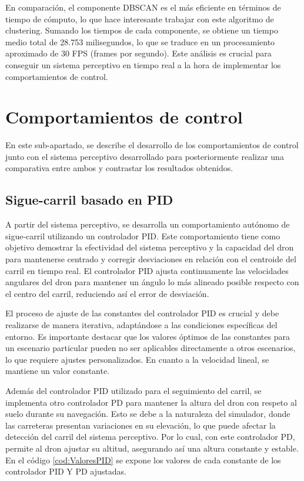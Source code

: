 En comparación, el componente DBSCAN es el más eficiente en términos de tiempo de cómputo, lo que hace interesante trabajar con este algoritmo de clustering. 
Sumando los tiempos de cada componente, se obtiene un tiempo medio total de 28.753 milisegundos, lo que se traduce en un procesamiento aproximado de 30 FPS (frames por segundo). 
Este análisis es crucial para conseguir un sistema perceptivo en tiempo real a la hora de implementar los comportamientos de control. 

  \section{Comportamientos de control}
  \label{sec:Control}

  En este sub-apartado, se describe el desarrollo de los comportamientos de control junto con el sistema perceptivo desarrollado para posteriormente realizar 
  una comparativa entre ambos y contrastar los resultados obtenidos.

\subsection{Sigue-carril basado en PID}
\label{sec:Control-PID}

A partir del sistema perceptivo, se desarrolla un comportamiento autónomo de sigue-carril utilizando un controlador PID. Este comportamiento tiene como objetivo
demostrar la efectividad del sistema perceptivo y la capacidad del dron para mantenerse centrado y corregir desviaciones en relación
con el centroide del carril en tiempo real. El controlador PID ajusta continuamente las velocidades angulares del dron para mantener un ángulo lo más alineado posible respecto con el
centro del carril, reduciendo así el error de desviación.

El proceso de ajuste de las constantes del controlador PID es crucial y debe realizarse de manera iterativa, adaptándose a las condiciones específicas del entorno. Es importante
destacar que los valores óptimos de las constantes para un escenario particular pueden no ser aplicables directamente a otros escenarios, lo que requiere ajustes personalizados. 
En cuanto a la velocidad lineal, se mantiene un valor constante.

Además del controlador PID utilizado para el seguimiento del carril, se implementa otro controlador PD para mantener la altura del dron con respeto al suelo durante su navegación. 
Esto se debe a la naturaleza del simulador, donde las carreteras presentan variaciones en su elevación, lo que puede afectar la detección del carril del sistema perceptivo. Por lo cual, 
con este controlador PD, permite al dron ajustar su altitud, asegurando así una altura constante y estable. En el código \ref{cod:ValoresPID} se expone los valores de cada 
constante de los controlador PID Y PD ajustadas.

